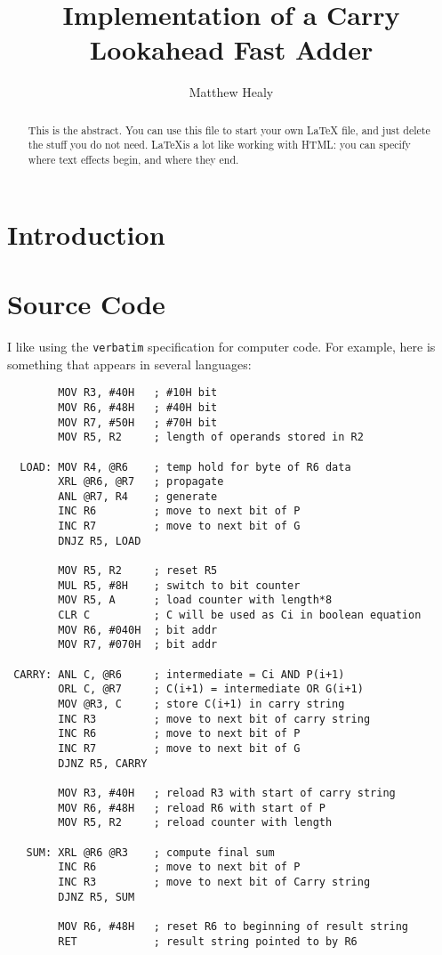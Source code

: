 \documentclass[journal]{IEEEtran}
\begin{document}
\title{Implementation of a Carry Lookahead Fast Adder}
\author{Matthew Healy}




\maketitle


\begin{abstract}
This is the abstract. You can use this file to start your own LaTeX file,
and just delete the stuff you do not need. \LaTeX  is a lot like working
with HTML: you can specify where text effects begin, and where they end.
\end{abstract}

\section{Introduction}\label{sec:intro}

\section{Source Code}\label{sec:code}

I like using the \verb"verbatim" specification for computer code.
For example, here is something that appears in several
languages:

\begin{verbatim}
        MOV R3, #40H   ; #10H bit
        MOV R6, #48H   ; #40H bit
        MOV R7, #50H   ; #70H bit
        MOV R5, R2     ; length of operands stored in R2

  LOAD: MOV R4, @R6    ; temp hold for byte of R6 data
        XRL @R6, @R7   ; propagate
        ANL @R7, R4    ; generate
        INC R6         ; move to next bit of P
        INC R7         ; move to next bit of G
        DNJZ R5, LOAD

        MOV R5, R2     ; reset R5
        MUL R5, #8H    ; switch to bit counter
        MOV R5, A      ; load counter with length*8
        CLR C          ; C will be used as Ci in boolean equation
        MOV R6, #040H  ; bit addr
        MOV R7, #070H  ; bit addr

 CARRY: ANL C, @R6     ; intermediate = Ci AND P(i+1)
        ORL C, @R7     ; C(i+1) = intermediate OR G(i+1)
        MOV @R3, C     ; store C(i+1) in carry string
        INC R3         ; move to next bit of carry string
        INC R6         ; move to next bit of P
        INC R7         ; move to next bit of G
        DJNZ R5, CARRY

        MOV R3, #40H   ; reload R3 with start of carry string
        MOV R6, #48H   ; reload R6 with start of P
        MOV R5, R2     ; reload counter with length

   SUM: XRL @R6 @R3    ; compute final sum
        INC R6         ; move to next bit of P
        INC R3         ; move to next bit of Carry string
        DJNZ R5, SUM

        MOV R6, #48H   ; reset R6 to beginning of result string
        RET            ; result string pointed to by R6
\end{verbatim}
\end{document}
